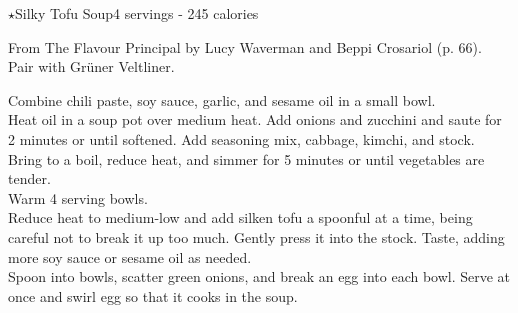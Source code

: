 \begin{recipe}{$\star$Silky Tofu Soup}{4 servings - 245 calories}{}

\freeform From {\normalfont The Flavour Principal} by Lucy Waverman and Beppi Crosariol (p. 66). Pair with Grüner Veltliner.


Combine chili paste, soy sauce, garlic, and sesame oil in a small bowl.\\

Heat oil in a soup pot over medium heat. Add onions and zucchini and saute for 2 minutes or until softened. Add seasoning mix, cabbage, kimchi, and stock. Bring to a boil, reduce heat, and simmer for 5 minutes or until vegetables are tender.\\

Warm 4 serving bowls.\\

Reduce heat to medium-low and add silken tofu a spoonful at a time, being careful not to break it up too much. Gently press it into the stock. Taste, adding more soy sauce or sesame oil as needed.\\

Spoon into bowls, scatter green onions, and break an egg into each bowl. Serve at once and swirl egg so that it cooks in the soup.

\end{recipe}